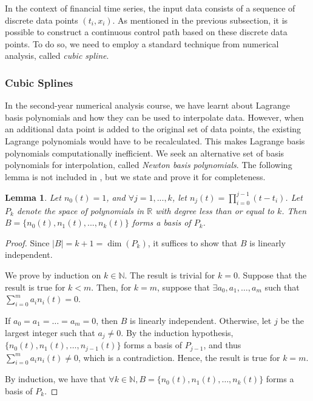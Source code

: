 \documentclass[a4paper,11pt,titlepage]{article}
\theoremstyle{definition}
\theoremstyle{plain}
\newtheorem{lemma}[theorem]{Lemma}
\theoremstyle{remark}
\begin{document}
In the context of financial time series, the input data consists of a sequence of discrete data points $\left(t_i,x_i\right)$. As mentioned in the previous subsection, it is possible to construct a continuous control path based on these discrete data points. To do so, we need to employ a standard technique from numerical analysis, called \textit{cubic spline}. 

\subsubsection{Cubic Splines}

In the second-year numerical analysis course, we have learnt about Lagrange basis polynomials and how they can be used to interpolate data. However, when an additional data point is added to the original set of data points, the existing Lagrange polynomials would have to be recalculated. This makes Lagrange basis polynomials computationally inefficient. We seek an alternative set of basis polynomials for interpolation, called \textit{Newton basis polynomials}. The following lemma is not included in \cite{Gautschi2012}, but we state and prove it for completeness.

\begin{lemma}
    Let $n_0(t)=1$, and $\forall j=1,...,k$, let $n_j(t)=\prod_{i=0}^{j-1}(t-t_i)$. Let $P_k$ denote the space of polynomials in $\mathbb{R}$ with  degree less than or equal to $k$. Then $B=\{n_0(t),n_1(t),...,n_k(t)\}$ forms a basis of $P_k$.
\end{lemma}

\begin{proof}
    Since $|B|=k+1=\dim(P_k)$, it suffices to show that $B$ is linearly independent.
    
    We prove by induction on $k\in\mathbb{N}$. The result is trivial for $k=0$. Suppose that the result is true for $k<m$. Then, for $k=m$, suppose that $\exists a_0,a_1,\dots,a_m$ such that $\sum_{i=0}^ma_in_i(t)=0$.

    If $a_0=a_1=\dots=a_m=0$, then $B$ is linearly independent. Otherwise, let $j$ be the largest integer such that $a_j\neq0$. By the induction hypothesis, $\{n_0(t),n_1(t),\dots,n_{j-1}(t)\}$ forms a basis of $P_{j-1}$, and thus $\sum_{i=0}^ma_in_i(t)\neq0$, which is a contradiction. Hence, the result is true for $k=m$.

    By induction, we have that $\forall k\in\mathbb{N}, B=\{n_0(t),n_1(t),\dots,n_k(t)\}$ forms a basis of $P_k$.
\end{proof}
\end{document}
